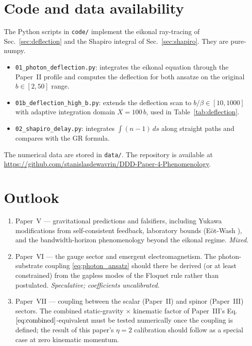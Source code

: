 \documentclass[11pt,a4paper]{article}
\begin{document}
\section{Code and data availability}
\label{sec:code}

The Python scripts in \texttt{code/} implement the eikonal
ray-tracing of Sec.~\ref{sec:deflection} and the Shapiro
integral of Sec.~\ref{sec:shapiro}. They are pure-numpy.

\begin{itemize}
\item \texttt{01\_photon\_deflection.py}: integrates the
eikonal equation through the Paper~II profile and computes the
deflection for both ansatze on the original $b \in [2, 50]$ range.
\item \texttt{01b\_deflection\_high\_b.py}: extends the
deflection scan to $b/\beta \in [10, 1000]$ with adaptive
integration domain $X = 100\,b$, used in
Table~\ref{tab:deflection}.
\item \texttt{02\_shapiro\_delay.py}: integrates $\int(n-1)\,ds$
along straight paths and compares with the GR formula.
\end{itemize}
The numerical data are stored in \texttt{data/}. The repository
is available at
\url{https://github.com/stanislasdewavrin/DDD-Paper-4-Phenomenology}.

\section{Outlook}
\label{sec:outlook}

\begin{enumerate}
\item Paper~V --- gravitational predictions and falsifiers,
including Yukawa modifications from self-consistent feedback,
laboratory bounds (E\"{o}t-Wash \cite{adelberger2003}), and the
bandwidth-horizon phenomenology beyond the eikonal regime.
\emph{Mixed.}
\item Paper~VI --- the gauge sector and emergent
electromagnetism. The photon-substrate coupling
\eqref{eq:photon_ansatz} should there be derived (or at least
constrained) from the gapless modes of the Floquet rule rather
than postulated. \emph{Speculative; coefficients uncalibrated.}
\item Paper~VII --- coupling between the scalar (Paper~II)
and spinor (Paper~III) sectors. The combined static-gravity
$\times$ kinematic factor of Paper~III's
Eq.~$\eqref{eq:combined}$-equivalent must be tested numerically
once the coupling is defined; the result of this paper's
$\eta = 2$ calibration should follow as a special case at
zero kinematic momentum.
\end{enumerate}
\end{document}
